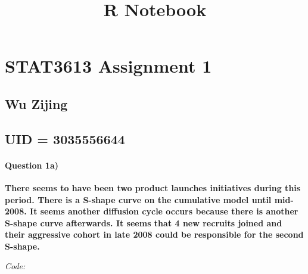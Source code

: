 \documentclass[]{article}
\title{R Notebook}
\author{}
\date{\vspace{-2.5em}}
\let\oldparagraph\paragraph
\renewcommand{\paragraph}[1]{\oldparagraph{#1}\mbox{}}
\begin{document}
\maketitle

\hypertarget{stat3613-assignment-1}{%
\section{STAT3613 Assignment 1}\label{stat3613-assignment-1}}

\hypertarget{wu-zijing}{%
\subsection{Wu Zijing}\label{wu-zijing}}

\hypertarget{uid-3035556644}{%
\subsection{UID = 3035556644}\label{uid-3035556644}}

\hypertarget{question-1a}{%
\paragraph{Question 1a)}\label{question-1a}}

\textbf{There seems to have been two product launches initiatives during
this period. There is a S-shape curve on the cumulative model until
mid-2008. It seems another diffusion cycle occurs because there is
another S-shape curve afterwards. It seems that 4 new recruits joined
and their aggressive cohort in late 2008 could be responsible for the
second S-shape.}

\emph{Code:}
\end{document}
